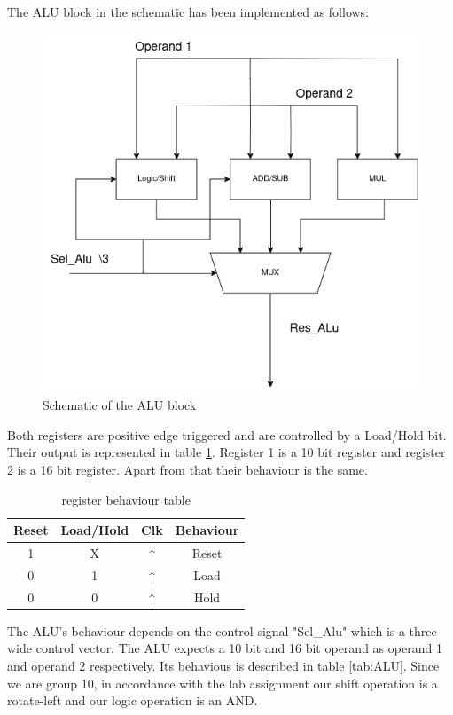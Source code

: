 \documentclass[12pt]{article}
\begin{document}
The ALU block in the schematic has been implemented as follows:

\begin{figure}[H]
	\centering
	\includegraphics[width=0.8\linewidth]{Imagens/ALU.png}
	\caption{Schematic of the ALU block}
	\label{fig:ALU}
\end{figure}

Both registers are positive edge triggered and are controlled by a Load/Hold bit. Their output is represented in table \ref{tab:Reg}. Register 1 is a 10 bit register and register 2 is a 16 bit register. Apart from that their behaviour is the same.

\begin{table}[H]
	\center
	\begin{tabular}{|c|c|c|c|}
		\hline
		Reset & Load/Hold & Clk        & Behaviour \\
		\hline
		1     & X         & $\uparrow$ & Reset     \\
		0     & 1         & $\uparrow$ & Load      \\
		0     & 0         & $\uparrow$ & Hold      \\
		\hline
	\end{tabular}
	\caption{register behaviour table}
	\label{tab:Reg}
\end{table}

The ALU's behaviour depends on the control signal "Sel\_Alu" which is a three wide control vector. The ALU expects a 10 bit and 16 bit operand as operand 1 and operand 2 respectively. Its behavious is described in table \ref{tab:ALU}. Since we are group 10, in accordance with the lab assignment our shift operation is a rotate-left and our logic operation is an AND.
\end{document}
